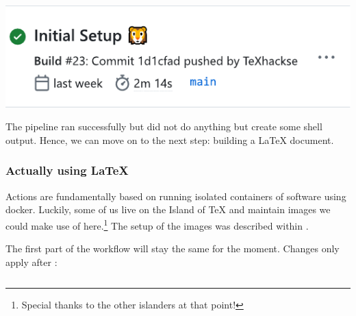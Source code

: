 \documentclass[final]{ltugboat}
\newcommand*{\directive}[1]{\textbf{\detokenize{#1}}}
\begin{document}
\noindent\includegraphics[width=\linewidth,alt={Cropping of a Screenshot from the GitHub Actions status page of a repository. The run was successful. The commit was von bei @TeXhackse and the commit message says  “Initial setup” followed by a lion emojy.}]{screenshot-pipeline-successful}

The pipeline ran successfully but did not do anything but create some shell output.
Hence, we can move on to the next step: building a \LaTeX{} document.

\subsubsection{Actually using \LaTeX}

Actions are fundamentally based on running isolated containers of software using docker.
Luckily, some of us live on the Island of \TeX{} and maintain images we could make use of here.\footnote{Special thanks to the other islanders at that point!}
The setup of the images was described within \cite{islandoftex-docker-short}.

The first part of the workflow will stay the same for the moment.
Changes only apply after \directive{runs-on}:

\inputminted[firstline=5, lastline=12,gobble=3]{yaml}{examples/latex-basic.yml}
\end{document}
